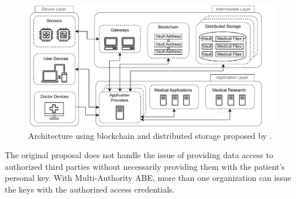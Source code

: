 \documentclass[cic,tc,english]{iiufrgs}
\numberwithin{algorithm}{chapter}
\begin{document}
            \begin{figure}
                \centering
                \includegraphics[width=1\textwidth]{images/diagrams/fig2-grefo.drawio.pdf}
                \caption{Architecture using blockchain and distributed storage proposed by \citet{laura2023}.}
                \label{fig:laura_arch}
            \end{figure}

            The original proposal does not handle the issue of providing data access to authorized third parties without necessarily providing them with the patient's personal key. With Multi-Authority ABE,  more than one organization can issue the keys with the authorized access credentials. 
\end{document}
